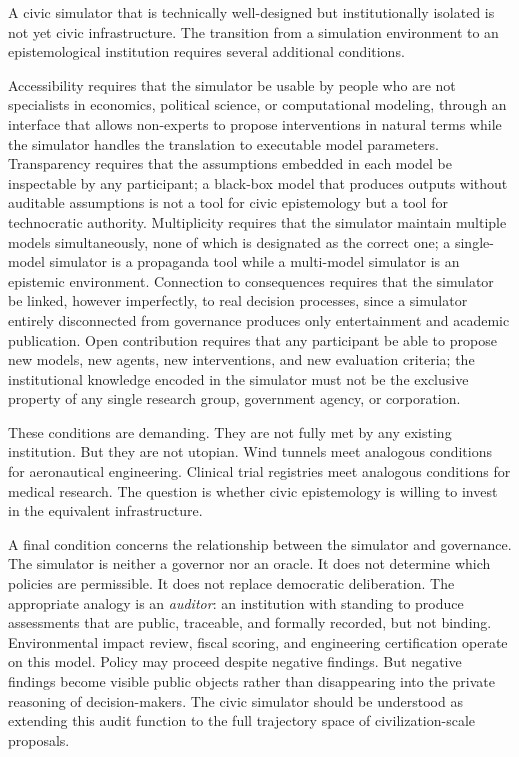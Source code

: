 \documentclass[12pt]{article}
\begin{document}
A civic simulator that is technically well-designed but institutionally isolated is not yet civic infrastructure. The transition from a simulation environment to an epistemological institution requires several additional conditions.

Accessibility requires that the simulator be usable by people who are not specialists in economics, political science, or computational modeling, through an interface that allows non-experts to propose interventions in natural terms while the simulator handles the translation to executable model parameters. Transparency requires that the assumptions embedded in each model be inspectable by any participant; a black-box model that produces outputs without auditable assumptions is not a tool for civic epistemology but a tool for technocratic authority. Multiplicity requires that the simulator maintain multiple models simultaneously, none of which is designated as the correct one; a single-model simulator is a propaganda tool while a multi-model simulator is an epistemic environment. Connection to consequences requires that the simulator be linked, however imperfectly, to real decision processes, since a simulator entirely disconnected from governance produces only entertainment and academic publication. Open contribution requires that any participant be able to propose new models, new agents, new interventions, and new evaluation criteria; the institutional knowledge encoded in the simulator must not be the exclusive property of any single research group, government agency, or corporation.

These conditions are demanding. They are not fully met by any existing institution. But they are not utopian. Wind tunnels meet analogous conditions for aeronautical engineering. Clinical trial registries meet analogous conditions for medical research. The question is whether civic epistemology is willing to invest in the equivalent infrastructure.

A final condition concerns the relationship between the simulator and governance. The simulator is neither a governor nor an oracle. It does not determine which policies are permissible. It does not replace democratic deliberation. The appropriate analogy is an \emph{auditor}: an institution with standing to produce assessments that are public, traceable, and formally recorded, but not binding. Environmental impact review, fiscal scoring, and engineering certification operate on this model. Policy may proceed despite negative findings. But negative findings become visible public objects rather than disappearing into the private reasoning of decision-makers. The civic simulator should be understood as extending this audit function to the full trajectory space of civilization-scale proposals.
\end{document}
